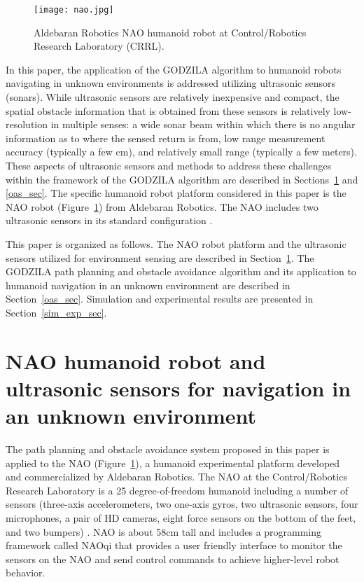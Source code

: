 \documentclass[10pt,conference]{ieeeconf}
\begin{document}
\begin{figure}[htb]
    \vspace*{-0.1in}
	\centerline{\texttt{[image: nao.jpg]}} 
        \caption{Aldebaran Robotics NAO humanoid robot \cite{NAO} at
      Control/Robotics Research Laboratory (CRRL).}
    \label{fig:nao}
    \vspace*{-0.1in}
\end{figure}



 
In this paper, the application of the GODZILA algorithm to humanoid robots
navigating in unknown environments is addressed utilizing ultrasonic sensors
(sonars).
While ultrasonic sensors are relatively inexpensive and compact, the spatial
obstacle information that is obtained from these sensors is relatively
low-resolution in multiple senses: a wide sonar beam within which there is no
angular information as to where the sensed return is from, low range
measurement accuracy (typically a few cm), and relatively small range (typically
a few meters). These aspects of ultrasonic sensors and methods to address
these challenges within the framework of the GODZILA algorithm are described
in Sections~\ref{nao_sec} and \ref{oas_sec}. The specific humanoid robot
platform considered in this paper is the NAO robot \cite{NAO} 
(Figure~\ref{fig:nao}) from Aldebaran Robotics. The NAO includes two
ultrasonic sensors in its standard configuration \cite{NAO_system}.


This paper is organized as follows.  The NAO robot platform and the ultrasonic sensors utilized for environment sensing are
described in Section~\ref{nao_sec}.  The GODZILA path planning and obstacle
avoidance algorithm and its application to humanoid navigation in an unknown
environment are described in Section~\ref{oas_sec}. Simulation and
experimental results are presented in Section~\ref{sim_exp_sec}.   


    \vspace*{0.02in}
\section{NAO humanoid robot and ultrasonic sensors for navigation in an unknown environment}
\label{nao_sec}
    \vspace*{0.02in}
The path planning and obstacle avoidance system proposed in this paper is
applied to the NAO (Figure~\ref{fig:nao}), a humanoid experimental platform
developed and commercialized by Aldebaran Robotics. The NAO at the
Control/Robotics Research Laboratory is a 25 degree-of-freedom humanoid
including a number of sensors (three-axis accelerometers, two one-axis gyros,
two ultrasonic sensors, four microphones, a pair of HD cameras, eight force
sensors on the bottom of the feet, and two bumpers) \cite{NAO_system}.  NAO is about 58cm tall and includes a programming framework called NAOqi that provides a user friendly interface to monitor the sensors on the NAO and send control commands to achieve higher-level robot behavior. 
\end{document}
